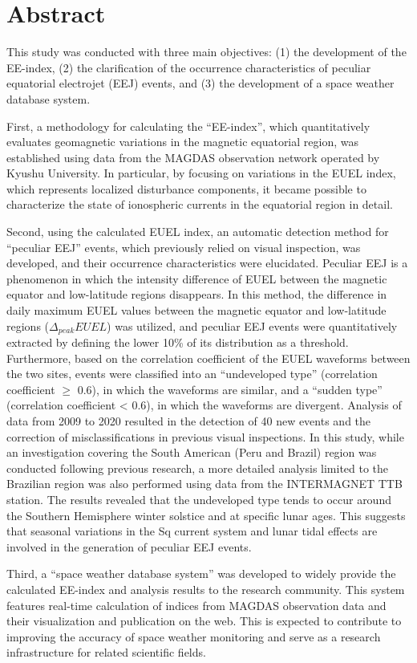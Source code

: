 \section*{Abstract}

This study was conducted with three main objectives: (1) the development of the EE-index, (2) the clarification of the occurrence characteristics of peculiar equatorial electrojet (EEJ) events, and (3) the development of a space weather database system.

First, a methodology for calculating the ``EE-index'', which quantitatively evaluates geomagnetic variations in the magnetic equatorial region, was established using data from the MAGDAS observation network operated by Kyushu University. In particular, by focusing on variations in the EUEL index, which represents localized disturbance components, it became possible to characterize the state of ionospheric currents in the equatorial region in detail.

Second, using the calculated EUEL index, an automatic detection method for ``peculiar EEJ'' events, which previously relied on visual inspection, was developed, and their occurrence characteristics were elucidated. Peculiar EEJ is a phenomenon in which the intensity difference of EUEL between the magnetic equator and low-latitude regions disappears. In this method, the difference in daily maximum EUEL values between the magnetic equator and low-latitude regions ($\Delta_{peak} EUEL$) was utilized, and peculiar EEJ events were quantitatively extracted by defining the lower 10\% of its distribution as a threshold. Furthermore, based on the correlation coefficient of the EUEL waveforms between the two sites, events were classified into an ``undeveloped type'' (correlation coefficient $\geq$ 0.6), in which the waveforms are similar, and a ``sudden type'' (correlation coefficient < 0.6), in which the waveforms are divergent.
Analysis of data from 2009 to 2020 resulted in the detection of 40 new events and the correction of misclassifications in previous visual inspections.
In this study, while an investigation covering the South American (Peru and Brazil) region was conducted following previous research, a more detailed analysis limited to the Brazilian region was also performed using data from the INTERMAGNET TTB station.
The results revealed that the undeveloped type tends to occur around the Southern Hemisphere winter solstice and at specific lunar ages. This suggests that seasonal variations in the Sq current system and lunar tidal effects are involved in the generation of peculiar EEJ events.

Third, a ``space weather database system'' was developed to widely provide the calculated EE-index and analysis results to the research community. This system features real-time calculation of indices from MAGDAS observation data and their visualization and publication on the web. This is expected to contribute to improving the accuracy of space weather monitoring and serve as a research infrastructure for related scientific fields.